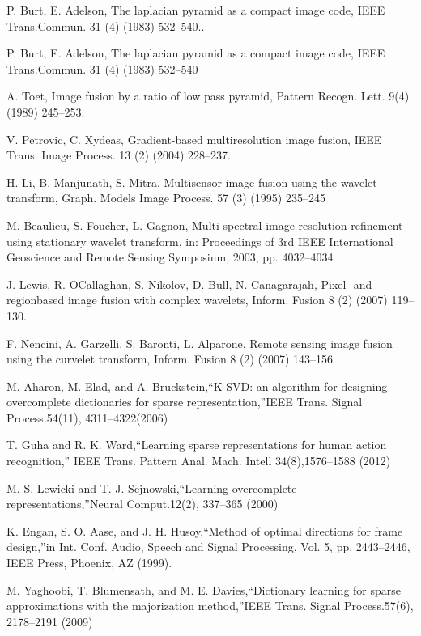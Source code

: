 \begin{thebibliography}{150}

    
   P. Burt, E. Adelson, The laplacian pyramid as a compact image code, IEEE Trans.Commun. 31 (4) (1983) 532–540..
 
  P. Burt, E. Adelson, The laplacian pyramid as a compact image code, IEEE Trans.Commun. 31 (4) (1983) 532–540
 

 A. Toet, Image fusion by a ratio of low pass pyramid, Pattern Recogn. Lett. 9(4)(1989) 245–253.

 V. Petrovic, C. Xydeas, Gradient-based multiresolution image fusion, IEEE Trans. Image Process. 13 (2) (2004) 228–237.


 H. Li, B. Manjunath, S. Mitra, Multisensor image fusion using the wavelet transform, Graph. Models Image Process. 57 (3) (1995) 235–245


 M. Beaulieu, S. Foucher, L. Gagnon, Multi-spectral image resolution refinement using stationary wavelet transform, in: Proceedings of 3rd IEEE International Geoscience and Remote Sensing Symposium, 2003, pp. 4032–4034


J. Lewis, R. OCallaghan, S. Nikolov, D. Bull, N. Canagarajah, Pixel- and regionbased image fusion with complex wavelets, Inform. Fusion 8 (2) (2007) 119–130.

 F. Nencini, A. Garzelli, S. Baronti, L. Alparone, Remote sensing image fusion using the curvelet transform, Inform. Fusion 8 (2) (2007) 143–156

M. Aharon, M. Elad, and A. Bruckstein,“K-SVD: an algorithm for designing overcomplete dictionaries for sparse representation,”IEEE Trans. Signal Process.54(11), 4311–4322(2006)

T. Guha and R. K. Ward,“Learning sparse representations for human action recognition,” IEEE Trans. Pattern Anal. Mach. Intell 34(8),1576–1588 (2012)

M. S. Lewicki and T. J. Sejnowski,“Learning overcomplete representations,”Neural Comput.12(2), 337–365 (2000)

K. Engan, S. O. Aase, and J. H. Husoy,“Method of optimal directions for frame design,”in Int. Conf. Audio, Speech and Signal Processing, Vol. 5, pp. 2443–2446, IEEE Press, Phoenix, AZ (1999).

 M. Yaghoobi, T. Blumensath, and M. E. Davies,“Dictionary learning for sparse approximations with the majorization method,”IEEE Trans. Signal Process.57(6), 2178–2191 (2009)


\end{thebibliography}
